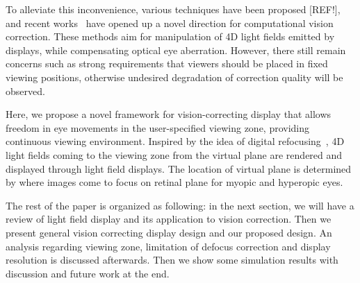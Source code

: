 To alleviate this inconvenience, various techniques have been proposed [REF!], and recent works~\cite{pamplona12,Huang:EECS-2011-162,huang14} have opened up a novel direction for computational vision correction. These methods aim for manipulation of 4D light fields emitted by displays, while compensating optical eye aberration. However, there still remain concerns such as strong requirements that viewers should be placed in fixed viewing positions, otherwise undesired degradation of correction quality will be observed.

Here, we propose a novel framework for vision-correcting display that allows freedom in eye movements in the user-specified viewing zone, providing continuous viewing environment. Inspired by the idea of digital refocusing~\cite{ng2005light}, 4D light fields coming to the viewing zone from the virtual plane are rendered and displayed through light field displays. The location of virtual plane is determined by where images come to focus on retinal plane for myopic and hyperopic eyes.

The rest of the paper is organized as following: in the next section, we will have a review of light field display and its application to vision correction. Then we present general vision correcting display design and our proposed design. An analysis regarding viewing zone, limitation of defocus correction and display resolution is discussed afterwards. Then we show some simulation results with discussion and future work at the end.